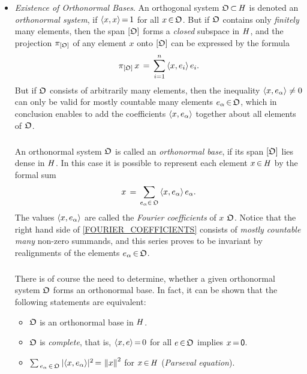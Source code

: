 \documentclass[11pt,twoside]{article}
\begin{document}
\begin{itemize}[leftmargin=22pt,itemsep=6pt]
\item[4.] \textit{Existence of Orthonormal Bases}.
An orthogonal system $\mathfrak{O} {\,\subset\,} \mathit{H}$ is denoted
an \textit{orthonormal system},
if $\langle x,x \rangle {\,=\,} 1$ for all $x {\,\in\,} \mathfrak{O}$.
But if $\mathfrak{O}$ contains only \textit{finitely} many elements,
then the span $[\mathfrak{O}]$ forms a \textit{closed} subspace in $\mathit{H}$,
and the projection $\pi_{[\mathfrak{O}]}$ of any element $x$ onto $[\mathfrak{O}]$
can be expressed by the formula
\[
\pi_{[\mathfrak{O}]} \, x \,=\, \sum_{i=1}^n \, \langle x,e_i \rangle \, e_i.
\]
But if $\mathfrak{O}$ consists of arbitrarily many elements,
then the inequality $\langle x,e_{\alpha} \rangle \neq 0$ can only be valid
for mostly countable many elements $e_{\alpha} {\,\in\,} \mathfrak{O}$,
which in conclusion enables to add the coefficients $\langle x,e_{\alpha} \rangle$
together about all elements of $\mathfrak{O}$.

\subparagraph{} %
An orthonormal system $\mathfrak{O}$ is called
an \textit{orthonormal base},
if its span $[ \mathfrak{O} ]$ lies dense in $\mathit{H}$.
In this case it is possible to represent each element $x {\,\in\,} \mathit{H}$
by the formal sum
\begin{equation}\label{FOURIER_COEFFICIENTS}
x \,=\, \sum_{e_{\alpha} \in \, \mathfrak{O}} \, \langle x,e_{\alpha} \rangle \, e_{\alpha}.
\end{equation}
The values $\langle x,e_{\alpha} \rangle$ are called
the \textit{Fourier coefficients} of $x$ {\wrt} $\mathfrak{O}$.
Notice that the right hand side of \eqref{FOURIER_COEFFICIENTS}
consists of \textit{mostly countable many} non-zero summands,
and this series proves to be invariant
by realignments of the elements $e_{\alpha} {\,\in\,} \mathfrak{O}$.

\subparagraph{}
There is of course the need to determine,
whether a given orthonormal system $\mathfrak{O}$ forms an orthonormal base.
In fact,
it can be shown that
the following statements are equivalent:

\begin{itemize}[leftmargin=9mm,itemsep=2pt]
\item[(a)]
$\mathfrak{O}$ is an orthonormal base in $\mathit{H}$.

\item[(b)]
$\mathfrak{O}$ is \textit{complete},
that is,
$\langle x,e \rangle {\,=\,} 0$ for all $e {\,\in\,} \mathfrak{O}$ implies $x {\,=\,} {\mathsf{0}}$.

\item[(c)]
$\sum_{\, e_{\alpha} \xeof \orthO} \,
\abs{ \scalar{x}{e_{\alpha}} } ^2 \eq \norm{x}^2$ for $x {\,\in\,} \mathit{H}$
(\textit{Parseval} \textit{equation}).
\end{itemize}


\end{itemize}
\end{document}
